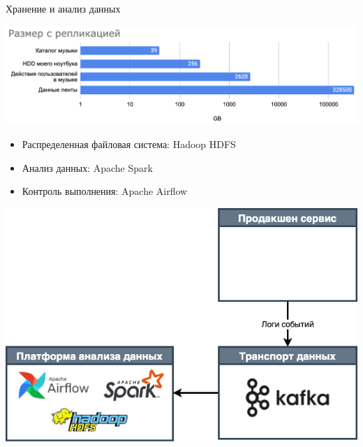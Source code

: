 \documentclass[11pt,aspectratio=169,handout]{beamer}
\newcommand{\vkitem}{\item[\color{vk}$\bullet$]}
\begin{document}
\begin{frame}{Хранение и анализ данных}

\begin{center}
\includegraphics[scale=0.5]{images/data-size.png}
\end{center}

\pause

\begin{itemize}[<+->]
\vkitem Распределенная файловая система: Hadoop HDFS
\vkitem Анализ данных: Apache Spark
\vkitem Контроль выполнения: Apache Airflow
\end{itemize}

\end{frame}

\begin{frame}{}

\begin{center}
\includegraphics[scale=0.35]{images/bigdata.png}
\end{center}

\end{frame}

{
\begin{frame}[plain]
\end{frame}
}
\end{document}
